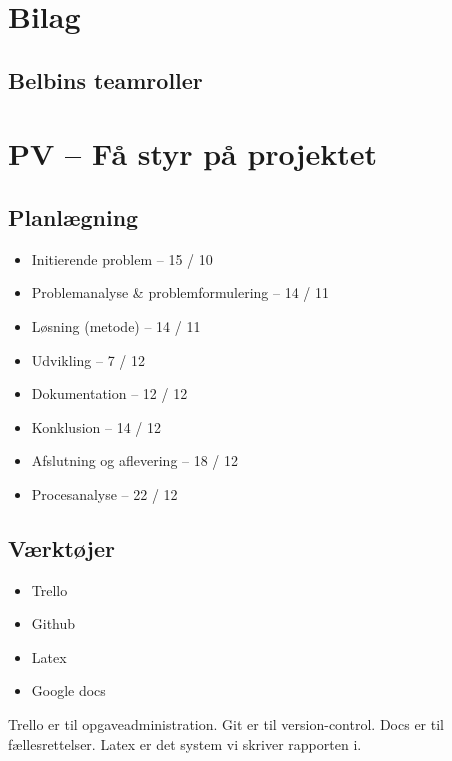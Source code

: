 \documentclass[oneside,a4paper,titlepage]{article}
\begin{document}

\clearpage
\section{Bilag}
\subsection{Belbins teamroller}
\label{sec:styr_paa_projektet}
\section*{PV – Få styr på projektet}
\subsection*{Planlægning}
\begin{itemize}
  \item Initierende problem – 15 / 10
  \item Problemanalyse \& problemformulering – 14 / 11
  \item Løsning (metode) – 14 / 11
  \item Udvikling – 7 / 12
  \item Dokumentation – 12 / 12
  \item Konklusion – 14 / 12
  \item Afslutning og aflevering – 18 / 12
  \item Procesanalyse – 22 / 12
\end{itemize}

\subsection*{Værktøjer}
\begin{itemize}
  \item Trello
  \item Github
  \item Latex
  \item Google docs
\end{itemize}
Trello er til opgaveadministration.
Git er til version-control.
Docs er til fællesrettelser.
Latex er det system vi skriver rapporten i.
\end{document}
